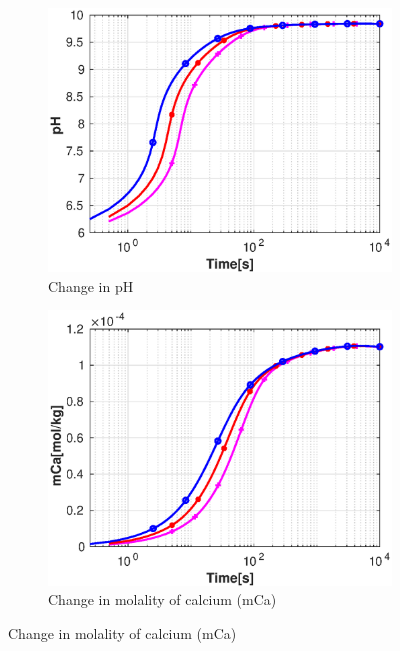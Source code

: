 \begin{figure}[!h]
        \centering
    \begin{subfigure}{.5\linewidth}
            \centering
        \includegraphics[width=\textwidth]{PICTURES/without_grid_pH.eps}
        \caption{Change in pH}
        \label{fig:withoutgridpH}
    \end{subfigure}%
        \hfill
    \begin{subfigure}{.5\linewidth}
            \centering
        \includegraphics[width=\textwidth]{PICTURES/without_grid_mCa.eps}
        \caption{Change in molality of calcium (mCa)}
        \label{fig:withoutgridmCa}
    \end{subfigure}%

\end{figure}
